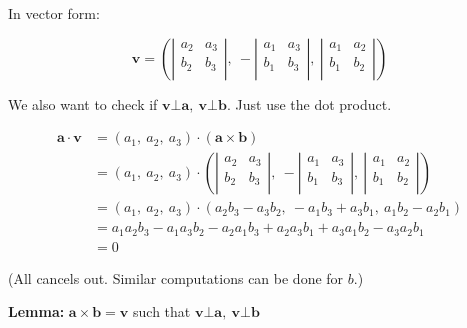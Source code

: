\documentclass[
]{article}
\begin{document}
In vector form:

$$\mathbf{v} = \left( \left| \begin{matrix}
a_{2} & a_{3} \\
b_{2} & b_{3} \\
\end{matrix} \right|,\  - \left| \begin{matrix}
a_{1} & a_{3} \\
b_{1} & b_{3} \\
\end{matrix} \right|,\ \left| \begin{matrix}
a_{1} & a_{2} \\
b_{1} & b_{2} \\
\end{matrix} \right| \right)$$

We also want to check if
$\mathbf{v}\bot\mathbf{a},\ \mathbf{v}\bot\mathbf{b}$.
Just use the dot product.

\begin{align*}
\mathbf{a} \cdot \mathbf{v} &= \left( a_{1},\ a_{2},\ a_{3} \right) \cdot \left( \mathbf{a} \times \mathbf{b} \right)
 \\
&= \left( a_{1},\ a_{2},\ a_{3} \right) \cdot \left( \left| \begin{matrix}
a_{2} & a_{3} \\
b_{2} & b_{3} \\
\end{matrix} \right|,\  - \left| \begin{matrix}
a_{1} & a_{3} \\
b_{1} & b_{3} \\
\end{matrix} \right|,\ \left| \begin{matrix}
a_{1} & a_{2} \\
b_{1} & b_{2} \\
\end{matrix} \right| \right)
 \\
&= \left( a_{1},\ a_{2},\ a_{3} \right) \cdot \left( a_{2}b_{3} - a_{3}b_{2},\  - a_{1}b_{3} + a_{3}b_{1},\ a_{1}b_{2} - a_{2}b_{1} \right)
 \\
&= a_{1}a_{2}b_{3} - a_{1}a_{3}b_{2} - a_{2}a_{1}b_{3} + a_{2}a_{3}b_{1} + a_{3}a_{1}b_{2} - a_{3}a_{2}b_{1}
 \\
&= 0
\end{align*}


(All cancels out. Similar computations can be done for $b$.)

\textbf{Lemma:}
$\mathbf{a} \times \mathbf{b} = \mathbf{v}$ such that
$\mathbf{v}\bot\mathbf{a},\ \mathbf{v}\bot\mathbf{b}$
\end{document}
